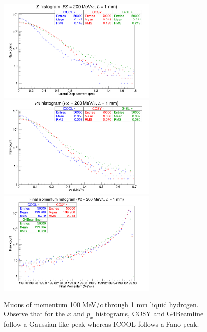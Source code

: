 \begin{figure}[H]
  \centering
    \includegraphics[width=0.7\textwidth]{Benchmarking/LH/X.200.1.png} 
    \includegraphics[width=0.7\textwidth]{Benchmarking/LH/PX.200.1.png} 
    \includegraphics[width=0.7\textwidth]{Benchmarking/LH/strag.200.1.png} 
  \caption[Muons of momentum 100 MeV/$c$ through 1 mm liquid hydrogen.]{Muons of momentum 100 MeV/$c$ through 1 mm liquid hydrogen. Observe that for the $x$ and $p_x$ histograms, COSY and G4Beamline follow a Gaussian-like peak whereas ICOOL follows a Fano peak.}
  \label{fig:200.1}
\end{figure}

